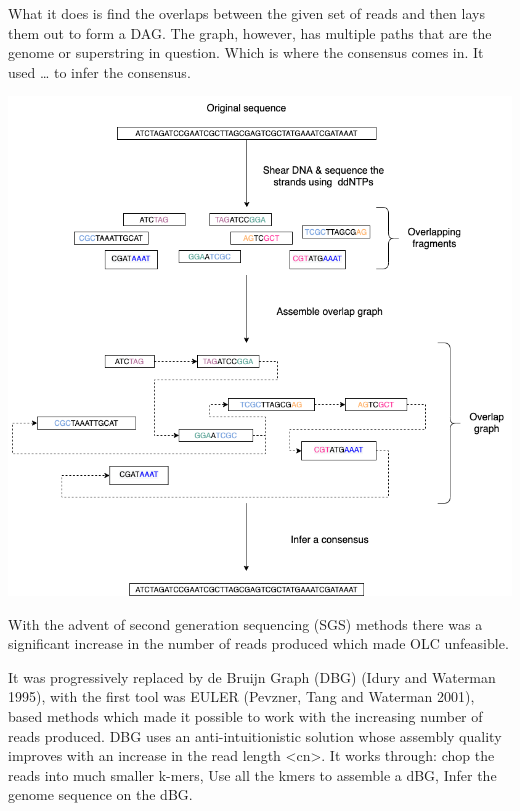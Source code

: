 \documentclass[11pt]{article}
\begin{document}
What it does is find the overlaps between the given set of reads and then lays 
them out to form a DAG. The graph, however, has multiple paths that are the 
genome or superstring in question. Which is where the consensus comes in. 
It used … to infer the consensus.

\begin{center}
\includegraphics[width=.9\linewidth]{./assets/images/OLC framework.png}
\end{center}

With the advent of second generation sequencing (SGS) 
methods there was a significant increase in the number of reads produced which
made OLC unfeasible. 

It was progressively replaced by de Bruijn Graph (DBG) (Idury and Waterman 1995),
with the first tool was EULER (Pevzner, Tang and Waterman 2001), 
based methods which made it possible to work with the increasing number of reads
produced. 
DBG uses an anti-intuitionistic solution whose assembly quality improves with an 
increase in the read length <cn>.
 It works through: chop the reads into much smaller k-mers, Use all the kmers 
to assemble a dBG, Infer the genome sequence on the dBG.
\end{document}
